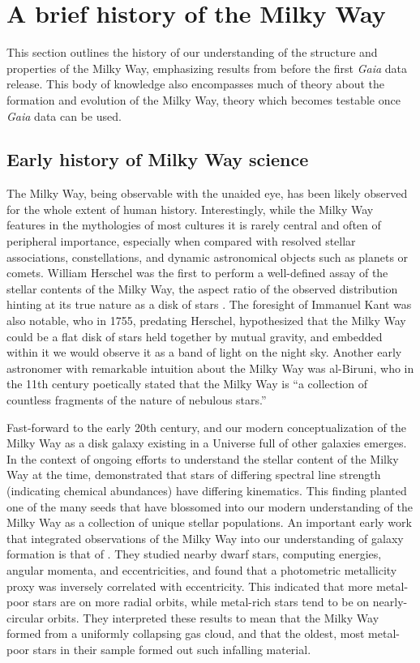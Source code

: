 
\section{A brief history of the Milky Way}

This section outlines the history of our understanding of the structure and properties of the Milky Way, emphasizing results from before the first \textit{Gaia} data release. This body of knowledge also encompasses much of theory about the formation and evolution of the Milky Way, theory which becomes testable once \textit{Gaia} data can be used. 

\subsection{Early history of Milky Way science}

The Milky Way, being observable with the unaided eye, has been likely observed for the whole extent of human history. Interestingly, while the Milky Way features in the mythologies of most cultures it is rarely central and often of peripheral importance, especially when compared with resolved stellar associations, constellations, and dynamic astronomical objects such as planets or comets. William Herschel was the first to perform a well-defined assay of the stellar contents of the Milky Way, the aspect ratio of the observed distribution hinting at its true nature as a disk of stars \parencite{herschel1785}. The foresight of Immanuel Kant was also notable, who in 1755, predating Herschel, hypothesized that the Milky Way could be a flat disk of stars held together by mutual gravity, and embedded within it we would observe it as a band of light on the night sky. Another early astronomer with remarkable intuition about the Milky Way was al-Biruni, who in the 11th century poetically stated that the Milky Way is ``a collection of countless fragments of the nature of nebulous stars.''

Fast-forward to the early 20th century, and our modern conceptualization of the Milky Way as a disk galaxy existing in a Universe full of other galaxies emerges. In the context of ongoing efforts to understand the stellar content of the Milky Way at the time, \textcite{roman50} demonstrated that stars of differing spectral line strength (indicating chemical abundances) have differing kinematics. This finding planted one of the many seeds that have blossomed into our modern understanding of the Milky Way as a collection of unique stellar populations. An important early work that integrated observations of the Milky Way into our understanding of galaxy formation is that of \textcite{eggen62}. They studied nearby dwarf stars, computing energies, angular momenta, and eccentricities, and found that a photometric metallicity proxy was inversely correlated with eccentricity. This indicated that more metal-poor stars are on more radial orbits, while metal-rich stars tend to be on nearly-circular orbits. They interpreted these results to mean that the Milky Way formed from a uniformly collapsing gas cloud, and that the oldest, most metal-poor stars in their sample formed out such infalling material.

